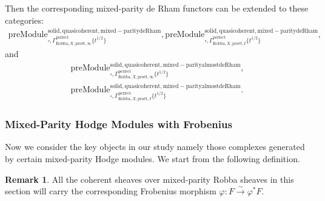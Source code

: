 \documentclass[12pt]{book}
\theoremstyle{definition}
\newtheorem{remark}{Remark}
\begin{document}
\indent Then the corresponding mixed-parity de Rham functors can be extended to these categories:
\begin{align}
\mathrm{preModule}^\mathrm{solid,quasicoherent,mixed-paritydeRham}_{\square,\Gamma^\mathrm{perfect}_{\text{Robba},X,\text{pro\'et},\infty}\{t^{1/2}\}},
\mathrm{preModule}^\mathrm{solid,quasicoherent,mixed-paritydeRham}_{\square,\Gamma^\mathrm{perfect}_{\text{Robba},X,\text{pro\'et},I}\{t^{1/2}\}}, 
\end{align}
and
\begin{align}
\mathrm{preModule}^\mathrm{solid,quasicoherent,mixed-parityalmostdeRham}_{\square,\Gamma^\mathrm{perfect}_{\text{Robba},X,\text{pro\'et},\infty}\{t^{1/2}\}},\\
\mathrm{preModule}^\mathrm{solid,quasicoherent,mixed-parityalmostdeRham}_{\square,\Gamma^\mathrm{perfect}_{\text{Robba},X,\text{pro\'et},I}\{t^{1/2}\}}. 
\end{align}



\subsubsection{Mixed-Parity Hodge Modules with Frobenius}


\noindent Now we consider the key objects in our study namely those complexes generated by certain mixed-parity Hodge modules. We start from the following definition.

\begin{remark}
All the coherent sheaves over mixed-parity Robba sheaves in this section will carry the corresponding Frobenius morphism $\varphi: F \overset{\sim}{\longrightarrow} \varphi^*F$.
\end{remark}
\end{document}
